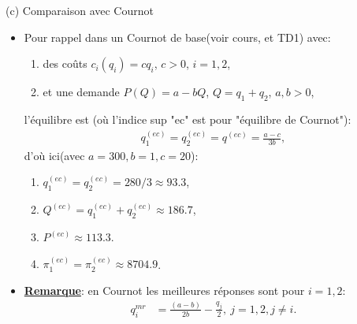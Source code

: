 \begin{frame}[allowframebreaks]{(c) Comparaison avec Cournot}
\begin{itemize} 
\item Pour rappel dans un Cournot de base(voir cours, et TD1) avec:
\begin{enumerate}[-]
\item des coûts $c_i(q_i) = cq_i$, $c>0$, $i=1, 2$,
\item et une demande $P(Q) = a - bQ$, $Q=q_1+q_2$, $a, b > 0$,
\end{enumerate}
l'équilibre est (où l'indice sup "ec" est pour "équilibre de Cournot"):
\begin{align*}
    q_1^{(ec)} = q_2^{(ec)} = q^{(ec)} = \frac{a-c}{3b},
\end{align*}
d'où ici(avec $a=300, b=1, c=20$): 
\begin{enumerate}[-]
\item $q_1^{(ec)}=q_2^{(ec)}=280/3 \approx 93.3$, 
\item $Q^{(ec)} = q_1^{(ec)}+q_2^{(ec)} \approx 186.7$,
\item $P^{(ec)} \approx 113.3$.
\item $\pi^{(ec)}_1 = \pi^{(ec)}_2 \approx 8704.9$.
\end{enumerate}

\item \textbf{\underline{Remarque}}: en Cournot les meilleures réponses sont pour $i=1, 2$:
\begin{align*}
    q_i^{mr}&=\frac{(a-b)}{2b} - \frac{q_j}{2}, \ j=1, 2, j\neq i.
\end{align*} 
\end{itemize}
\end{frame}


